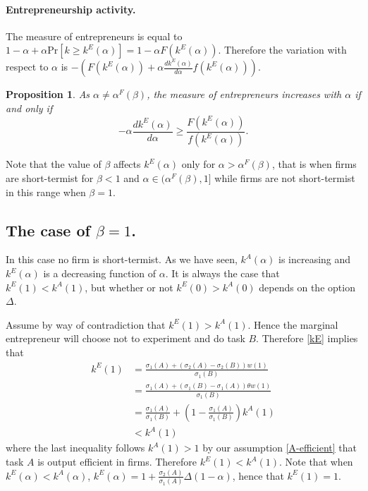 \documentclass[12pt]{article}
\newtheorem{proposition}{Proposition} \theoremstyle{definition}
\begin{document}
\paragraph{Entrepreneurship activity.} The measure of entrepreneurs is equal to $1-\alpha+\alpha \text{Pr}[k\geq k^E(\alpha)]=1-\alpha F(k^E(\alpha))$. Therefore the variation with respect to $\alpha$ is $-(F(k^E(\alpha))+\alpha \frac{dk^E(\alpha)}{d\alpha}f(k^E(\alpha)))$. 

\begin{proposition}\label{prop:change-ent}
    As $\alpha\neq \alpha^F(\beta)$, the measure of entrepreneurs increases with $\alpha$ if and only if
    \begin{equation*}
      -\alpha \frac{dk^E(\alpha)}{d\alpha}\geq \frac{F(k^E(\alpha))}{f(k^E(\alpha))}.
    \end{equation*}
\end{proposition}
%
Note that the value of $\beta$ affects $k^E(\alpha)$ only for $\alpha>\alpha^F(\beta)$, that is when firms are short-termist for $\beta<1$ and $\alpha\in(\alpha^F(\beta),1]$ while firms are not short-termist in this range when $\beta=1$.



\subsection{The case of $\beta=1$.} In this case no firm is short-termist. As we have seen, $k^A(\alpha)$ is increasing and $k^E(\alpha)$ is a decreasing function of $\alpha$. It is always the case that $k^E(1)<k^A(1)$, but whether or not $k^E(0)>k^A(0)$ depends on the option $\Delta$.

Assume by way of contradiction that  $k^E(1)> k^A(1)$. Hence the marginal entrepreneur will choose not to experiment and do task $B$. Therefore \eqref{kE} implies that 
%
\begin{align*}
    k^E(1)&=\frac{\sigma_1(A)+(\sigma_2(A)-\sigma_2(B))w(1)}{\sigma_1(B)}\\ 
    &= \frac{\sigma_1(A)+(\sigma_1(B)-\sigma_1(A))\theta  w(1)}{\sigma_1(B)}\\ 
    &=\frac{\sigma_1(A)}{\sigma_1(B)}+\left(1-\frac{\sigma_1(A)}{\sigma_1(B)}\right)k^A(1)\\ 
    &<k^A(1)
\end{align*}
where the last inequality follows $k^A(1)>1$ by our assumption \ref{A-efficient} that task $A$ is output efficient in firms. Therefore $k^E(1)<k^A(1)$. Note that when $k^E(\alpha)<k^A(\alpha)$, $k^E(\alpha)=1+\frac{\sigma_2(A)}{\sigma_1(A)}\Delta(1-\alpha)$, hence that $k^E(1)=1$.
\end{document}
